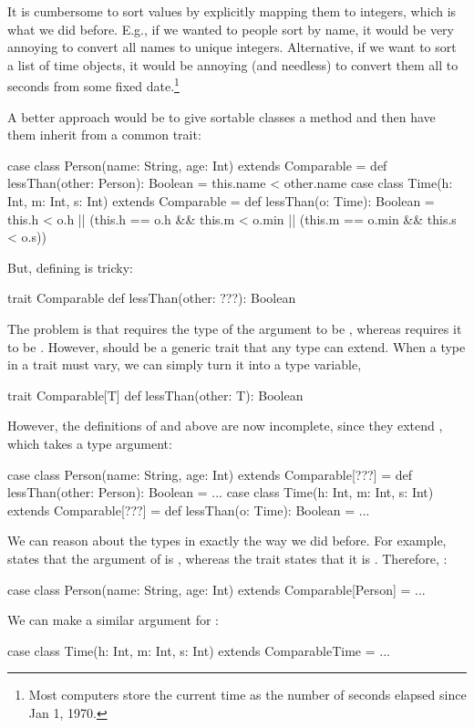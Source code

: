 \documentclass[9pt]{extbook}
\begin{document}
It is cumbersome to sort values by explicitly mapping them to integers,
which is what we did before.
E.g., if we wanted to people sort by name, it would be very annoying to convert
all names to unique integers. Alternative, if we want to sort a list of time
objects, it would be annoying (and needless) to convert them all to seconds
from some fixed date.\footnote{Most computers store the current time as the number of seconds elapsed since Jan 1, 1970.}

A better approach would be to give sortable classes a  method
and then have them inherit from a common trait:
\begin{scalacode}
case class Person(name: String, age: Int) extends Comparable = {
  def lessThan(other: Person): Boolean = this.name < other.name
}
case class Time(h: Int, m: Int, s: Int) extends Comparable = {
  def lessThan(o: Time): Boolean = this.h < o.h || (this.h == o.h && this.m < o.min || (this.m == o.min && this.s < o.s))
}
\end{scalacode}
But, defining  is tricky:
\begin{scalacode}
trait Comparable {
  def lessThan(other: ???): Boolean
}
\end{scalacode}
The problem is that  requires the type of the argument
to be , whereas  requires it to be .
However,  should be a generic trait that any type can extend.
When a type in a trait must vary, we can simply turn it into a type variable,
\begin{scalacode}
trait Comparable[T] {
  def lessThan(other: T): Boolean
}
\end{scalacode}
However, the definitions of  and 
above are now incomplete, since they extend , which
takes a type argument:
\begin{scalacode}
case class Person(name: String, age: Int) extends Comparable[???] = {
  def lessThan(other: Person): Boolean = ...
}
case class Time(h: Int, m: Int, s: Int) extends Comparable[???] = {
  def lessThan(o: Time): Boolean = ...
}
\end{scalacode}
We can reason about the types in exactly the way we did before.
For example,  states that the argument of 
is , whereas the trait states that it is .
Therefore, :
\begin{scalacode}
case class Person(name: String, age: Int) extends Comparable[Person] = ...
\end{scalacode}
We can make a similar argument for :
\begin{scalacode}
case class Time(h: Int, m: Int, s: Int) extends ComparableTime = ...
\end{scalacode}
\end{document}
